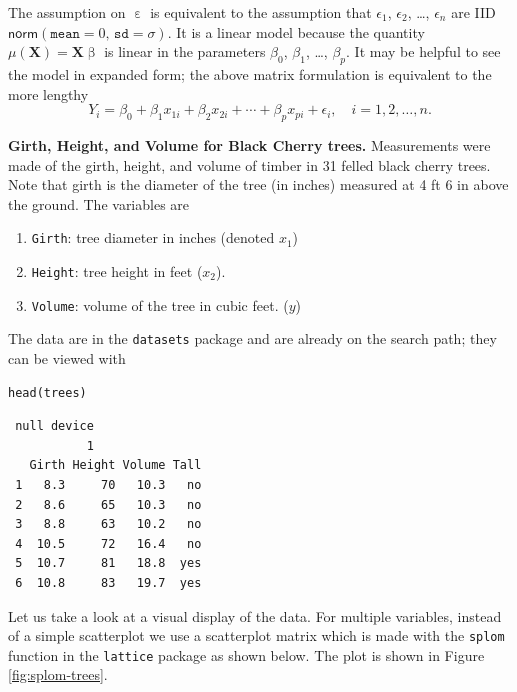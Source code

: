 \documentclass[captions=tableheading]{scrbook}
\begin{document}
The assumption on \(\upepsilon\) is equivalent to the assumption that \(\epsilon_{1}\), \(\epsilon_{2}\), \ldots{}, \(\epsilon_{n}\) are IID \(\mathsf{norm}(\mathtt{mean}=0,\,\mathtt{sd}=\sigma)\). It is a linear model because the quantity \(\mu(\mathbf{X})=\mathbf{X}\upbeta\) is linear in the parameters \(\beta_{0}\), \(\beta_{1}\), \ldots{}, \(\beta_{p}\). It may be helpful to see the model in expanded form; the above matrix formulation is equivalent to the more lengthy
\begin{equation} 
Y_{i}=\beta_{0}+\beta_{1}x_{1i}+\beta_{2}x_{2i}+\cdots+\beta_{p}x_{pi}+\epsilon_{i},\quad i=1,2,\ldots,n.
\end{equation}

\begin{example}
\textbf{Girth, Height, and Volume for Black Cherry trees.} 
Measurements were made of the girth, height, and volume of timber in 31 felled black cherry trees. Note that girth is the diameter of the tree (in inches) measured at 4 ft 6 in above the ground. The variables are

\begin{enumerate}
\item \texttt{Girth}: tree diameter in inches (denoted \(x_{1}\))
\item \texttt{Height}: tree height in feet (\(x_{2}\)).
\item \texttt{Volume}: volume of the tree in cubic feet. (\(y\))
\end{enumerate}

The data are in the \texttt{datasets} package and are already on the search path; they can be viewed with


\begin{verbatim}
head(trees)
\end{verbatim}

\begin{verbatim}
 null device 
           1
   Girth Height Volume Tall
 1   8.3     70   10.3   no
 2   8.6     65   10.3   no
 3   8.8     63   10.2   no
 4  10.5     72   16.4   no
 5  10.7     81   18.8  yes
 6  10.8     83   19.7  yes
\end{verbatim}

Let us take a look at a visual display of the data. For multiple variables, instead of a simple scatterplot we use a scatterplot matrix which is made with the \texttt{splom} function in the \texttt{lattice} package \cite{Sarkarlattice} as shown below. The plot is shown in Figure \ref{fig:splom-trees}.



\end{example}
\end{document}
